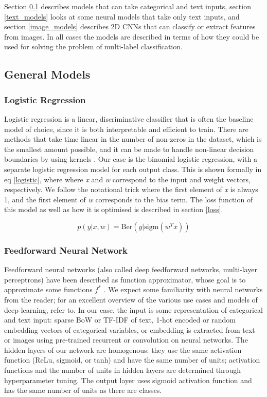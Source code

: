 Section \ref{general_models} describes models that can take categorical and text inputs, section \ref{text_models} looks at some neural models that take only text inputs, and section \ref{image_models} describes 2D CNNs that can classify or extract features from images.
In all cases the models are described in terms of how they could be used for solving the problem of multi-label classification.

\subsection{General Models}
\label{general_models}



\subsubsection{Logistic Regression}

Logistic regression is a linear, discriminative classifier that is often the baseline model of choice, since it is both interpretable and efficient to train.
There are methods that take time linear in the number of non-zeros in the dataset, which is the smallest amount possible, and it can be made to handle non-linear decision boundaries by using kernels \cite{murphy}.
Our case is the binomial logistic regression, with a separate logistic regression model for each output class.
This is shown formally in eq  \ref{logistic}, where where \textit{x} and \textit{w} correspond to the input and weight vectors, respectively.
We follow the notational trick where the first element of \textit{x} is always 1, and the first element of \textit{w} corresponds to the bias term.
The loss function of this model as well as how it is optimised is described in section \ref{loss}.

\begin{equation}
\label{logistic}
p(y|x,w)=\mathrm{Ber}(y|\mathrm{sigm}(w^Tx))
\end{equation}

\subsubsection{Feedforward Neural Network}

Feedforward neural networks (also called deep feedforward networks, multi-layer perceptrons) have been described as function approximator, whose goal is to approximate some functions $f^*$ \cite{dlb}.
We expect some familiarity with neural networks from the reader; for an excellent overview of the various use cases and models of deep learning, refer to.
In our case, the input is some representation of categorical and text input: sparse BoW or TF-IDF of text, 1-hot encoded or random embedding vectors of categorical variables, or embedding is extracted from text or images using pre-trained recurrent or convolution on neural networks.
The hidden layers of our network are homogenous: they use the same activation function (ReLu, sigmoid, or tanh) and have the same number of units;  activation functions and the number of units in hidden layers are determined through hyperparameter tuning.
The output layer uses sigmoid activation function  and has the same number of units as there are classes.

